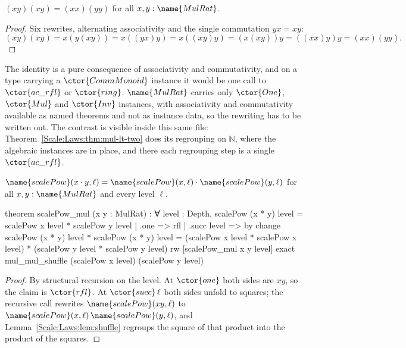 \begin{lemma}
\label{Scale:Laws:lem:shuffle}
$(xy)(xy) = (xx)(yy)$ for all $x,y : \name{MulRat}$.
\end{lemma}

\begin{proof}
Six rewrites, alternating associativity and the single commutation
$yx = xy$:
\[
  (xy)(xy) = x(y(xy)) = x((yx)y) = x((xy)y) = (x(xy))y = ((xx)y)y = (xx)(yy).
\]
\end{proof}

\begin{remark}\label{Scale:Laws:rem:no-ac}
The identity is a pure consequence of associativity and commutativity, and on
a type carrying a $\ctor{CommMonoid}$ instance it would be one call to
$\ctor{ac\_rfl}$ or $\ctor{ring}$.  $\name{MulRat}$ carries only $\ctor{One}$,
$\ctor{Mul}$ and $\ctor{Inv}$ instances, with associativity and commutativity
available as named theorems and not as instance data, so the rewriting has to
be written out.  The contrast is visible inside this same file:
Theorem~\ref{Scale:Laws:thm:mul-lt-two} does its regrouping on $\mathbb{N}$,
where the algebraic instances are in place, and there each regrouping step is
a single $\ctor{ac\_rfl}$.
\end{remark}

\begin{lemma}\label{Scale:Laws:lem:scalepow-mul}
$\name{scalePow}(x \cdot y, \ell) =
 \name{scalePow}(x, \ell) \cdot \name{scalePow}(y, \ell)$
for all $x, y : \name{MulRat}$ and every level $\ell$.
\end{lemma}

\begin{leancode}
theorem scalePow_mul (x y : MulRat) :
    ∀ level : Depth,
      scalePow (x * y) level = scalePow x level * scalePow y level
  | .one => rfl
  | .succ level => by
      change
        scalePow (x * y) level * scalePow (x * y) level =
          (scalePow x level * scalePow x level) *
            (scalePow y level * scalePow y level)
      rw [scalePow_mul x y level]
      exact mul_mul_shuffle (scalePow x level) (scalePow y level)
\end{leancode}

\begin{proof}
By structural recursion on the level.  At $\ctor{one}$ both sides are $xy$, so
the claim is $\ctor{rfl}$.  At $\ctor{succ}\,\ell$ both sides unfold to
squares; the recursive call rewrites $\name{scalePow}(xy,\ell)$ to
$\name{scalePow}(x,\ell)\,\name{scalePow}(y,\ell)$, and
Lemma~\ref{Scale:Laws:lem:shuffle} regroups the square of that product into
the product of the squares.
\end{proof}

